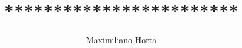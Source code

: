 \documentclass[12pt,a4paper,norsk]{article}
\begin{document}
\title{************************}
\author{Maximiliano Horta}

\maketitle

\newpage
\end{document}
